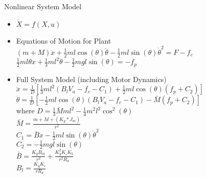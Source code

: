 \documentclass{beamer}
\begin{document}
\begin{frame}{Nonlinear System Model}
\begin{itemize}
\pause \item $\dot{X}=f\left(X,u\right)$
\pause \item Equations of Motion for Plant\\
$\left(m+M\right)\ddot{x}+\frac{1}{2}ml\cos\left(\theta\right)\ddot{\theta}-\frac{1}{2}ml\sin\left(\theta\right)\dot{\theta}^2=F-f_c$\\
$\frac{1}{2}ml\mathsf{\theta}\ddot{x}+\frac{1}{3}ml^2\ddot{\theta}-\frac{1}{2}mgl\sin\left(\theta\right)=-f_p$
\pause \item Full System Model (including Motor Dynamics)\\
$\ddot{x}=\frac{1}{D}\left[\frac{1}{3}ml^2\left(B_lV_a-f_c-C_1\right)+\frac{1}{2}ml\cos\left(\theta\right)\left(f_p+C_2\right)\right]$
$\ddot{\theta}=\frac{1}{D}\left[-\frac{1}{2}ml\cos\left(\theta\right)\left(B_lV_a-f_c-C_1\right)-\bar{M}\left(f_p+C_2\right)\right]$ \\
\pause where
$D=\frac{1}{3}\bar{M}ml^2-\frac{1}{4}m^2l^2\cos^2\left(\theta\right)$\\
$\bar{M}=\frac{m+M+(K_g*J_m)}{r^2}$\\
$C_1=\bar{B}\dot{x}-\frac{1}{2}ml\sin\left(\theta\right)\dot{\theta}^2$\\
$C_2=-\frac{1}{2}mgl\sin\left(\theta\right)$\\
$\bar{B}=\frac{K_gB_m}{r^2}+\frac{K_g^2K_iK_b}{r^2R_a}$\\
$B_l=\frac{K_gK_i}{rR_a}$
\end{itemize}


\end{frame}
\end{document}
